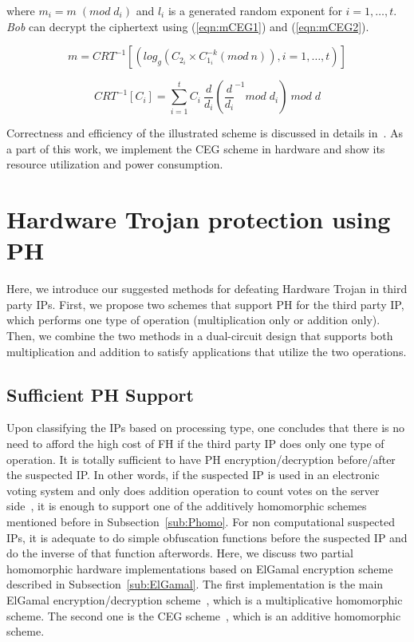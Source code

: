\documentclass[conference]{IEEEtran}
\begin{document}
\noindent where $m_i = m \; (mod \; d_i)$ and $l_i$ is a generated random exponent for $i = 1,\dots,t$. \textit{Bob} can decrypt the ciphertext using (\ref{eqn:mCEG1}) and (\ref{eqn:mCEG2}).

\begin{equation}
m = CRT^{-1} [(log_g(C_{2_i} \times C_{1_i}^{-k} (mod \: n)) , i = 1,\dots,t)]
\label{eqn:mCEG1}
\end{equation}

\begin{equation}
CRT^{-1}[C_i] = \sum_{i = 1}^{t}C_i \: \frac{d}{d_i} (\frac{d}{d_i}^{-1} mod \; d_i) \: mod \; d
\label{eqn:mCEG2}
\end{equation}


\noindent Correctness and efficiency of the illustrated scheme is discussed in details in{\color{blue}~\cite{homoCRT}}. As a part of this work, we implement the CEG scheme in hardware and show its resource utilization and power consumption.
\section{Hardware Trojan protection using PH} \label{sec:prot}

Here, we introduce our suggested methods for defeating Hardware Trojan in third party IPs. First, we propose two schemes that support PH for the third party IP, which performs one type of operation (multiplication only or addition only). Then, we combine the two methods in a dual-circuit design that supports both multiplication and addition to satisfy applications that utilize the two operations.  

\subsection{Sufficient PH Support} 


Upon classifying the IPs based on processing type, one concludes that there is no need to afford the high cost of FH if the third party IP does only one type of operation. It is totally sufficient to have PH encryption/decryption before/after the suspected IP. In other words, if the suspected IP is used in an electronic voting system and only does addition operation to count votes on the server side{\color{blue}~\cite{conf:voting}}, it is enough to support one of the additively homomorphic schemes mentioned before in Subsection~\ref{sub:Phomo}. For non computational suspected IPs, it is adequate to do simple obfuscation functions before the suspected IP and do the inverse of that function afterwords. Here, we discuss two partial homomorphic hardware implementations based on ElGamal encryption scheme described in Subsection~\ref{sub:ElGamal}. The first implementation is the main ElGamal encryption/decryption scheme{\color{blue}~\cite{ElGamal85}}, which is a multiplicative homomorphic scheme. The second one is the CEG scheme{\color{blue}~\cite{homoCRT}}, which is an additive homomorphic scheme.  
\end{document}
